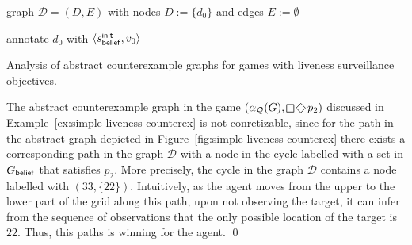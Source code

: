 \begin{algorithm}[h] \small
{}

\smallskip

graph $\mathcal D = (D,E)$ with nodes $D := \{d_0\}$ and edges $E := \emptyset$\;

annotate $d_0$ with $\langle s_{\mathsf{belief}}^{\mathsf{init}}, v_0\rangle$\; 


{\KwRet{$\pi$;}}
{}

\smallskip

\caption{Analysis of abstract counterexample graphs for games with liveness surveillance objectives.}
\label{algo:cex-analysis-liveness}
\end{algorithm}

\begin{example}\label{ex:simple-liveness-unconcretizable}
The abstract counterexample graph in the game $(\alpha_\part(G),\LTLglobally \LTLfinally p_2)$ discussed in Example~\ref{ex:simple-liveness-counterex} is not conretizable, since for the path in the abstract graph depicted in Figure~\ref{fig:simple-liveness-counterex} there exists a corresponding path in the graph $\mathcal D$ with a node in the cycle labelled with a set in $G_{\mathsf{belief}}$ that satisfies $p_2$. More precisely, the cycle in the graph $\mathcal D$ contains a node labelled with $(33,\{22\})$. Intuitively, as the agent moves from the upper to the lower part of the grid along this path, upon not observing the target, it can infer from the sequence of observations that the only possible location of the target is $22$. Thus, this paths is winning for the agent.
\qed
\end{example}

